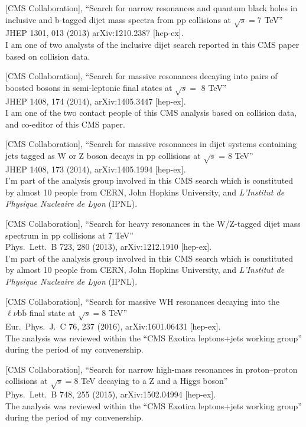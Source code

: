 \documentclass[10pt, a4paper]{article}
\begin{document}
\begin{thebibliography}{599}
[CMS Collaboration],
 ``Search for narrow resonances and quantum black holes in inclusive and b-tagged dijet mass spectra from pp collisions at $\sqrt{s}=7$ TeV''\\
 JHEP 1301, 013 (2013) arXiv:1210.2387 [hep-ex].
 \\ I am one of two analysts of the inclusive dijet search reported in this CMS paper based on collision data.

[CMS Collaboration],
 ``Search for massive resonances decaying into pairs of boosted bosons in semi-leptonic final states at $\sqrt{s} =$ 8 TeV''\\
  JHEP 1408, 174 (2014), arXiv:1405.3447 [hep-ex].
  \\I am one of the two contact people of this CMS analysis based on collision data, and co-editor of this CMS paper.

[CMS Collaboration],
``Search for massive resonances in dijet systems containing jets
   tagged as W or Z boson decays in pp collisions at $ \sqrt{s} $ = 8 TeV''\\ 
JHEP 1408, 173 (2014), arXiv:1405.1994 [hep-ex].
 \\ I'm part of the analysis group involved in this CMS search which is constituted by almost 10 people from CERN, John Hopkins University, and \textit{L'Institut de Physique Nucleaire de Lyon} (IPNL).

[CMS Collaboration],
 ``Search for heavy resonances in the W/Z-tagged dijet mass spectrum in pp collisions at 7 TeV''\\
Phys.\ Lett.\ B 723, 280 (2013), arXiv:1212.1910 [hep-ex].
 \\ I'm part of the analysis group involved in this CMS search which
 is constituted by almost 10 people from CERN, John Hopkins
 University, and \textit{L'Institut de Physique Nucleaire de Lyon}
 (IPNL).

[CMS Collaboration],
 ``Search for massive WH resonances decaying into the $\ell \nu \mathrm{b} \overline{\mathrm{b}} $ final state at $\sqrt{s}=8$ TeV''\\
  Eur.\ Phys.\ J.\ C 76, 237 (2016), arXiv:1601.06431 [hep-ex].\\
The analysis was reviewed within the ``CMS Exotica leptons+jets working group'' during
the period of my convenership.

 [CMS Collaboration],
 ``Search for narrow high-mass resonances in proton–proton collisions at $\sqrt{s}=8$ TeV decaying to a Z and a Higgs boson''\\
  Phys.\ Lett.\ B 748, 255 (2015), arXiv:1502.04994 [hep-ex].\\
The analysis was reviewed within the ``CMS Exotica leptons+jets working group'' during
the period of my convenership.


\end{thebibliography}
\end{document}
